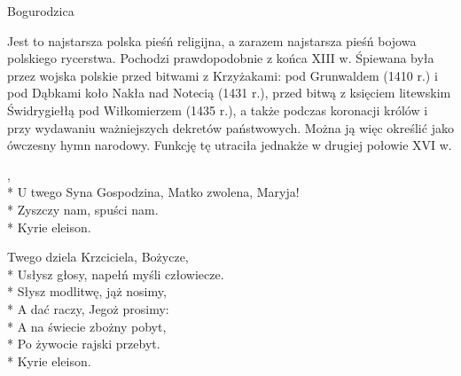 \song
{Bogurodzica}
\begin{info}Jest to najstarsza polska pieśń religijna, a zarazem najstarsza pieśń bojowa polskiego rycerstwa. Pochodzi prawdopodobnie z końca XIII w. Śpiewana była przez wojska polskie przed bitwami z Krzyżakami: pod Grunwaldem (1410 r.) i pod Dąbkami koło Nakła nad Notecią (1431 r.), przed bitwą z księciem litewskim Świdrygiełłą pod Wiłkomierzem (1435 r.), a także podczas koronacji królów i przy wydawaniu ważniejszych dekretów państwowych. Można ją więc określić jako ówczesny hymn narodowy. Funkcję tę utraciła jednakże w drugiej połowie XVI w.\end{info}

\begin{lyrics}[longestline={U twego Syna Gospodzina, Matko zwolena, Maryja!}]

,\\*
U twego Syna Gospodzina, Matko zwolena, Maryja!\\*
Zyszczy nam, spuści nam.\\*
Kyrie eleison.

Twego dziela Krzciciela, Bożycze,\\*
Usłysz głosy, napełń myśli człowiecze.\\*
Słysz modlitwę, jąż nosimy,\\*
A dać raczy, Jegoż prosimy:\\*
A na świecie zbożny pobyt,\\*
Po żywocie rajski przebyt.\\*
Kyrie eleison.
\end{lyrics}




